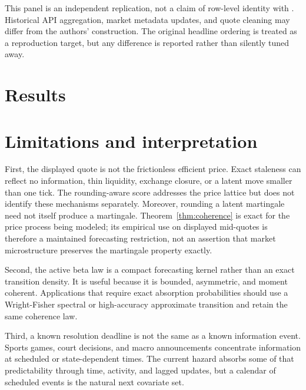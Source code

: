 \documentclass[11pt]{article}
\newcommand{\1}{\mathbb I}
\begin{document}
This panel is an independent replication, not a claim of row-level identity
with \citet{xi2026volatility}. Historical API aggregation, market metadata
updates, and quote cleaning may differ from the authors' construction. The
original headline ordering is treated as a reproduction target, but any
difference is reported rather than silently tuned away.

\section{Results}


\section{Limitations and interpretation}

First, the displayed quote is not the frictionless efficient price. Exact
staleness can reflect no information, thin liquidity, exchange closure, or a
latent move smaller than one tick. The rounding-aware score addresses the price
lattice but does not identify these mechanisms separately. Moreover, rounding a
latent martingale need not itself produce a martingale. Theorem~\ref{thm:coherence}
is exact for the price process being modeled; its empirical use on displayed
mid-quotes is therefore a maintained forecasting restriction, not an assertion
that market microstructure preserves the martingale property exactly.

Second, the active beta law is a compact forecasting kernel rather than an exact
transition density. It is useful because it is bounded, asymmetric, and moment
coherent. Applications that require exact absorption probabilities should use a
Wright-Fisher spectral or high-accuracy approximate transition and retain the
same coherence law.

Third, a known resolution deadline is not the same as a known information
event. Sports games, court decisions, and macro announcements concentrate
information at scheduled or state-dependent times. The current hazard absorbs
some of that predictability through time, activity, and lagged updates, but a
calendar of scheduled events is the natural next covariate set.
\end{document}

